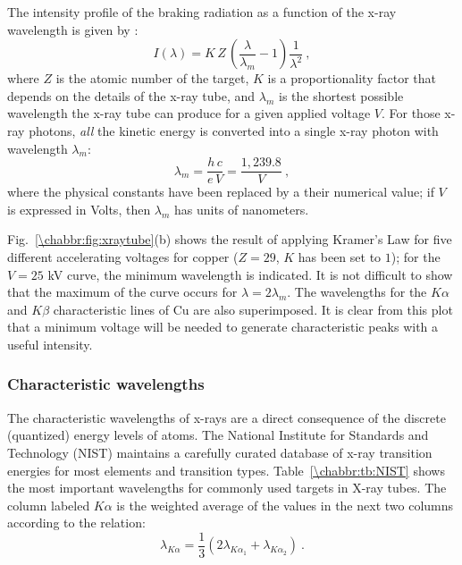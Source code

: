 The intensity profile of the braking radiation as a function of the x-ray wavelength is given by :
\begin{equation}
	I(\lambda) = K\,Z\,\left(\frac{\lambda}{\lambda_m}-1\right)\frac{1}{\lambda^2}\ ,\label{\chabbr:eq:KramersLaw}
\end{equation}
where $Z$ is the atomic number of the target, $K$ is a proportionality factor that depends on the details of the x-ray tube, and $\lambda_m$ is the shortest possible wavelength the x-ray tube can produce for a given applied voltage $V$. For those x-ray photons, \textit{all} the kinetic energy is converted into a single x-ray photon with wavelength $\lambda_m$:
\[
	\lambda_m = \frac{h\,c}{e\,V} = \frac{1,239.8}{V}\ ,
\]
where the physical constants have been replaced by a their numerical value; if $V$ is expressed in Volts, then $\lambda_m$ has units of nanometers.

Fig.~\ref{\chabbr:fig:xraytube}(b) shows the result of applying Kramer's Law for five different accelerating voltages for copper ($Z=29$, $K$ has been set to $1$); for the $V=25$ kV curve, the minimum wavelength is indicated.  It is not difficult to show that the maximum of the curve occurs for $\lambda=2\lambda_m$.  The wavelengths for the $K\alpha$ and $K\beta$ characteristic lines of Cu are also superimposed.  It is clear from this plot that a minimum voltage will be needed to generate characteristic peaks with a useful intensity.  

\subsubsection{Characteristic wavelengths}\label{\chabbr:ssec:charWL}

The characteristic wavelengths of x-rays are a direct consequence of the discrete (quantized) energy levels of atoms. The National Institute for Standards and Technology (NIST) maintains a carefully curated database of x-ray transition energies for most elements and transition types. Table~\ref{\chabbr:tb:NIST} shows the most important wavelengths for commonly used targets in X-ray tubes.  The column labeled $K\alpha$ is the weighted average of the values in the next two columns according to the relation:
\[
	\lambda_{K\alpha} = \frac{1}{3}\left(2\lambda_{K\alpha_1}+\lambda_{K\alpha_2}\right)\ .
\]

